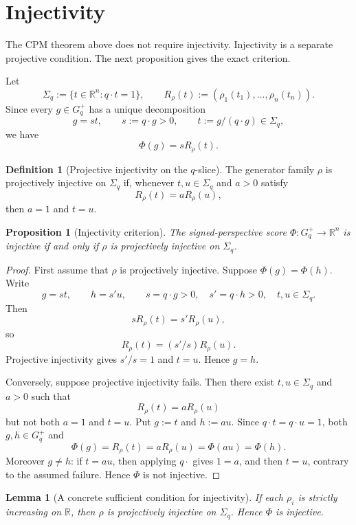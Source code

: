 \documentclass[11pt]{article}
\theoremstyle{plain}
\newtheorem{lemma}[theorem]{Lemma}
\newtheorem{proposition}[theorem]{Proposition}
\theoremstyle{definition}
\newtheorem{definition}[theorem]{Definition}
\theoremstyle{remark}
\newcommand{\R}{\mathbb{R}}
\begin{document}
\section{Injectivity}

The CPM theorem above does not require injectivity. Injectivity is a separate projective condition. The next proposition gives the exact criterion.

Let
\[
\Sigma_q:=\{t\in\R^n:q\cdot t=1\},
\qquad
R_\rho(t):=(\rho_1(t_1),\ldots,\rho_n(t_n)).
\]
Since every $g\in G_q^+$ has a unique decomposition
\[
g=s t,
\qquad s:=q\cdot g>0,
\qquad t:=g/(q\cdot g)\in\Sigma_q,
\]
we have
\[
\Phi(g)=sR_\rho(t).
\]

\begin{definition}[Projective injectivity on the $q$-slice]
The generator family $\rho$ is projectively injective on $\Sigma_q$ if, whenever $t,u\in\Sigma_q$ and $a>0$ satisfy
\[
R_\rho(t)=aR_\rho(u),
\]
then $a=1$ and $t=u$.
\end{definition}

\begin{proposition}[Injectivity criterion]
The signed-perspective score $\Phi:G_q^+\to\R^n$ is injective if and only if $\rho$ is projectively injective on $\Sigma_q$.
\end{proposition}

\begin{proof}
First assume that $\rho$ is projectively injective. Suppose $\Phi(g)=\Phi(h)$. Write
\[
g=s t,
\qquad h=s' u,
\qquad s=q\cdot g>0,
\quad s'=q\cdot h>0,
\quad t,u\in\Sigma_q.
\]
Then
\[
sR_\rho(t)=s'R_\rho(u),
\]
so
\[
R_\rho(t)=(s'/s)R_\rho(u).
\]
Projective injectivity gives $s'/s=1$ and $t=u$. Hence $g=h$.

Conversely, suppose projective injectivity fails. Then there exist $t,u\in\Sigma_q$ and $a>0$ such that
\[
R_\rho(t)=aR_\rho(u)
\]
but not both $a=1$ and $t=u$. Put $g:=t$ and $h:=a u$. Since $q\cdot t=q\cdot u=1$, both $g,h\in G_q^+$ and
\[
\Phi(g)=R_\rho(t)=aR_\rho(u)=\Phi(a u)=\Phi(h).
\]
Moreover $g\ne h$: if $t=au$, then applying $q\cdot$ gives $1=a$, and then $t=u$, contrary to the assumed failure. Hence $\Phi$ is not injective.
\end{proof}

\begin{lemma}[A concrete sufficient condition for injectivity]
If each $\rho_i$ is strictly increasing on $\R$, then $\rho$ is projectively injective on $\Sigma_q$. Hence $\Phi$ is injective.
\end{lemma}
\end{document}
